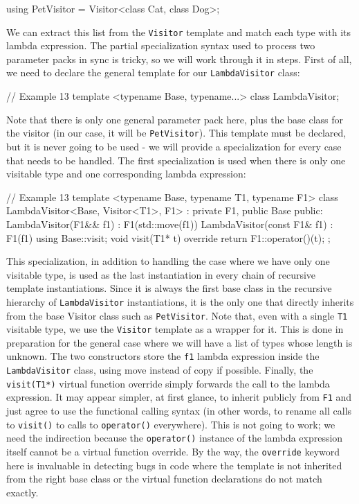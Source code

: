 \begin{code}
using PetVisitor = Visitor<class Cat, class Dog>;
\end{code}

We can extract this list from the \texttt{Visitor} template and match each type with its lambda expression. The partial specialization syntax used to process two parameter packs in sync is tricky, so we will work through it in steps. First of all, we need to declare the general template for our \texttt{LambdaVisitor} class:

\begin{code}
// Example 13
template <typename Base, typename...>
class LambdaVisitor;
\end{code}

Note that there is only one general parameter pack here, plus the base class for the visitor (in our case, it will be \texttt{PetVisitor}). This template must be declared, but it is never going to be used - we will provide a specialization for every case that needs to be handled. The first specialization is used when there is only one visitable type and one corresponding lambda expression:

\begin{code}
// Example 13
template <typename Base, typename T1, typename F1>
class LambdaVisitor<Base, Visitor<T1>, F1> :
  private F1, public Base
{
  public:
  LambdaVisitor(F1&& f1) : F1(std::move(f1)) {}
  LambdaVisitor(const F1& f1) : F1(f1) {}
  using Base::visit;
  void visit(T1* t) override { return F1::operator()(t); }
};
\end{code}

This specialization, in addition to handling the case where we have only one visitable type, is used as the last instantiation in every chain of recursive template instantiations. Since it is always the first base class in the recursive hierarchy of \texttt{LambdaVisitor} instantiations, it is the only one that directly inherits from the base Visitor class such as \texttt{PetVisitor}. Note that, even with a single \texttt{T1} visitable type, we use the \texttt{Visitor} template as a wrapper for it. This is done in preparation for the general case where we will have a list of types whose length is unknown. The two constructors store the \texttt{f1} lambda expression inside the \texttt{LambdaVisitor} class, using move instead of copy if possible. Finally, the \texttt{visit(T1*)} virtual function override simply forwards the call to the lambda expression. It may appear simpler, at first glance, to inherit publicly from \texttt{F1} and just agree to use the functional calling syntax (in other words, to rename all calls to \texttt{visit()} to calls to \texttt{operator()} everywhere). This is not going to work; we need the indirection because the \texttt{operator()} instance of the lambda expression itself cannot be a virtual function override. By the way, the \texttt{override} keyword here is invaluable in detecting bugs in code where the template is not inherited from the right base class or the virtual function declarations do not match exactly.

